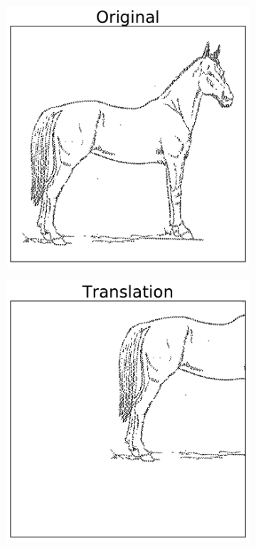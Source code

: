 \begin{figure}[H] %
\captionsetup[subfigure]{justification=centering}
\centering
\begin{subfigure}{.32\textwidth}
    \centering
    \includegraphics[width=\linewidth]{OriginalHorse.pdf}
\end{subfigure}%
\begin{subfigure}{.32\textwidth}
    \centering
    \includegraphics[width=\linewidth]{TranslationHorse.pdf}
\end{subfigure}
\end{figure}

